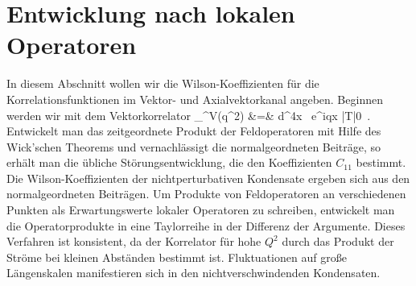 \section{Entwicklung nach lokalen Operatoren}
In diesem Abschnitt wollen wir die Wilson-Koeffizienten f\"ur die 
Korrelationsfunktionen im Vektor- und Axialvektorkanal angeben. Beginnen 
werden wir mit dem Vektorkorrelator
\beq
 \Pi_{\mu\nu}^V(q^2) &=&  \int d^4x \, e^{iq\cdot x}
    |T |0\rangle  \, .\nonumber
\eeq
Entwickelt man das zeitgeordnete Produkt der Feldoperatoren mit
Hilfe des Wick'schen Theorems und vernachl\"assigt die 
normalgeordneten Beitr\"age, so erh\"alt man die \"ubliche 
St\"orungsentwicklung, die den Koeffizienten
$C_{1\!\!1}$ bestimmt. Die Wilson-Koeffizienten der nichtperturbativen
Kondensate ergeben sich aus den normalgeordneten Beitr\"agen. 
Um Produkte von Feldoperatoren an verschiedenen Punkten als
Erwartungswerte lokaler Operatoren zu schreiben, entwickelt
man die Operatorprodukte in  eine  Taylorreihe in der 
Differenz der Argumente. Dieses Verfahren ist konsistent, da der 
Korrelator f\"ur hohe $Q^2$ durch das Produkt der Str\"ome bei
kleinen Abst\"anden bestimmt ist. Fluktuationen auf
gro\ss e L\"angenskalen manifestieren sich in den 
nichtverschwindenden Kondensaten. 


